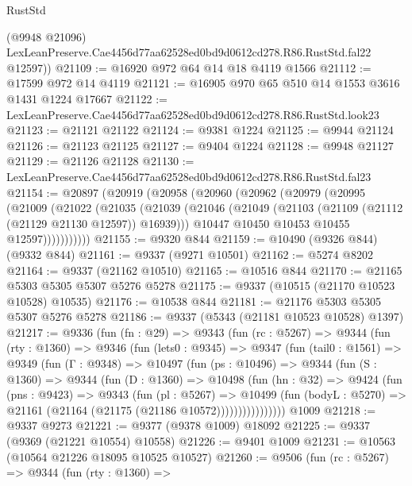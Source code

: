 \begin{lexlean}{RustStd}
\begin{coremodule}
        (@9948 @21096)
        LexLeanPreserve.Cae4456d77aa62528ed0bd9d0612cd278.R86.RustStd.fal22
        @12597))
@21109 := @16920 @972 @64 @14 @18 @4119 @1566
@21112 := @17599 @972 @14 @4119
@21121 := @16905 @970 @65 @510 @14 @1553 @3616 @1431 @1224 @17667
@21122 := LexLeanPreserve.Cae4456d77aa62528ed0bd9d0612cd278.R86.RustStd.look23
@21123 := @21121 @21122
@21124 := @9381 @1224
@21125 := @9944 @21124
@21126 := @21123 @21125
@21127 := @9404 @1224
@21128 := @9948 @21127
@21129 := @21126 @21128
@21130 := LexLeanPreserve.Cae4456d77aa62528ed0bd9d0612cd278.R86.RustStd.fal23
@21154 := @20897
    (@20919
      (@20958
        (@20960
          (@20962
            (@20979
              (@20995
                (@21009
                  (@21022
                    (@21035
                      (@21039
                        (@21046
                          (@21049 (@21103 (@21109 (@21112 (@21129 @21130 @12597)) @16939)))
                          @10447
                          @10450
                          @10453
                          @10455
                          @12597)))))))))))
@21155 := @9320 @844
@21159 := @10490 (@9326 @844) (@9332 @844)
@21161 := @9337 (@9271 @10501)
@21162 := @5274 @8202
@21164 := @9337 (@21162 @10510)
@21165 := @10516 @844
@21170 := @21165 @5303 @5305 @5307 @5276 @5278
@21175 := @9337 (@10515 (@21170 @10523 @10528) @10535)
@21176 := @10538 @844
@21181 := @21176 @5303 @5305 @5307 @5276 @5278
@21186 := @9337 (@5343 (@21181 @10523 @10528) @1397)
@21217 := @9336
    (fun (fn : @29) =>
    @9343
      (fun (rc : @5267) =>
      @9344
        (fun (rty : @1360) =>
        @9346
          (fun (lets0 : @9345) =>
          @9347
            (fun (tail0 : @1561) =>
            @9349
              (fun (Γ : @9348) =>
              @10497
                (fun (ps : @10496) =>
                @9344
                  (fun (S : @1360) =>
                  @9344
                    (fun (D : @1360) =>
                    @10498
                      (fun (hn : @32) =>
                      @9424
                        (fun (pns : @9423) =>
                        @9343
                          (fun (pl : @5267) =>
                          @10499
                            (fun (bodyL : @5270) =>
                            @21161 (@21164 (@21175 (@21186 @10572))))))))))))))))
    @1009
@21218 := @9337 @9273
@21221 := @9377 (@9378 @1009) @18092
@21225 := @9337 (@9369 (@21221 @10554) @10558)
@21226 := @9401 @1009
@21231 := @10563 (@10564 @21226 @18095 @10525 @10527)
@21260 := @9506
    (fun (rc : @5267) =>
    @9344
      (fun (rty : @1360) =>

\end{coremodule}
\end{lexlean}
